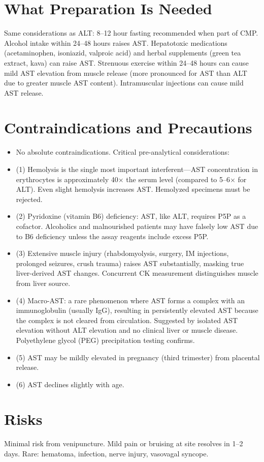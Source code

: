\section*{What Preparation Is Needed}
Same considerations as ALT: 8--12 hour fasting recommended when part of CMP. Alcohol intake within 24--48 hours raises AST. Hepatotoxic medications (acetaminophen, isoniazid, valproic acid) and herbal supplements (green tea extract, kava) can raise AST. Strenuous exercise within 24--48 hours can cause mild AST elevation from muscle release (more pronounced for AST than ALT due to greater muscle AST content). Intramuscular injections can cause mild AST release.

\section*{Contraindications and Precautions}
\begin{itemize}
  \item No absolute contraindications. Critical pre-analytical considerations:
  \item (1) Hemolysis is the single most important interferent---AST concentration in erythrocytes is approximately 40$\times$ the serum level (compared to 5--6$\times$ for ALT). Even slight hemolysis increases AST. Hemolyzed specimens must be rejected.
  \item (2) Pyridoxine (vitamin B6) deficiency: AST, like ALT, requires P5P as a cofactor. Alcoholics and malnourished patients may have falsely low AST due to B6 deficiency unless the assay reagents include excess P5P.
  \item (3) Extensive muscle injury (rhabdomyolysis, surgery, IM injections, prolonged seizures, crush trauma) raises AST substantially, masking true liver-derived AST changes. Concurrent CK measurement distinguishes muscle from liver source.
  \item (4) Macro-AST: a rare phenomenon where AST forms a complex with an immunoglobulin (usually IgG), resulting in persistently elevated AST because the complex is not cleared from circulation. Suggested by isolated AST elevation without ALT elevation and no clinical liver or muscle disease. Polyethylene glycol (PEG) precipitation testing confirms.
  \item (5) AST may be mildly elevated in pregnancy (third trimester) from placental release.
  \item (6) AST declines slightly with age.
\end{itemize}
\section*{Risks}
Minimal risk from venipuncture. Mild pain or bruising at site resolves in 1--2 days. Rare: hematoma, infection, nerve injury, vasovagal syncope.

